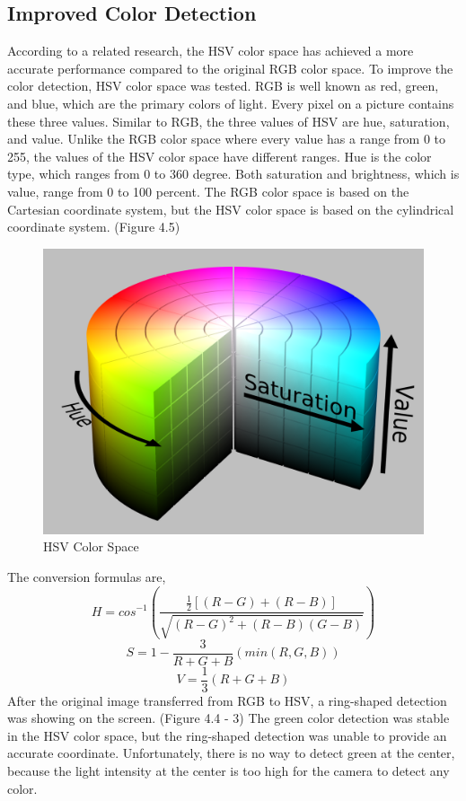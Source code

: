 \subsection{Improved Color Detection}

According to a related research, the HSV color space has achieved a more accurate performance compared to the original RGB color space. \cite{kaur2013content} To improve the color detection, HSV color space was tested. RGB is well known as red, green, and blue, which are the primary colors of light. Every pixel on a picture contains these three values. Similar to RGB, the three values of HSV are hue, saturation, and value. Unlike the RGB color space where every value has a range from 0 to 255, the values of the HSV color space have different ranges. Hue is the color type, which ranges from 0 to 360 degree. Both saturation and brightness, which is value, range from 0 to 100 percent. The RGB color space is based on the Cartesian coordinate system, but the HSV color space is based on the cylindrical coordinate system. (Figure 4.5)
\begin{figure}[ht!]
\begin{center}
\includegraphics[scale = 0.2]{pics/HSV.png}
\caption{HSV Color Space}
\end{center}
\end{figure}

The conversion formulas are,
\begin{equation}
H = cos^{-1}(\frac{\frac{1}{2}[(R-G)+(R-B)]}{\sqrt{(R-G)^{2}+(R-B)(G-B)}})
\end{equation}
\begin{equation}
S = 1-\frac{3}{R+G+B}(min(R,G,B))
\end{equation}
\begin{equation}
V = \frac{1}{3}(R+G+B)
\end{equation}
After the original image transferred from RGB to HSV, a ring-shaped detection was showing on the screen. (Figure 4.4 - 3) The green color detection was stable in the HSV color space, but the ring-shaped detection was unable to provide an accurate coordinate. Unfortunately, there is no way to detect green at the center, because the light intensity at the center is too high for the camera to detect any color.
